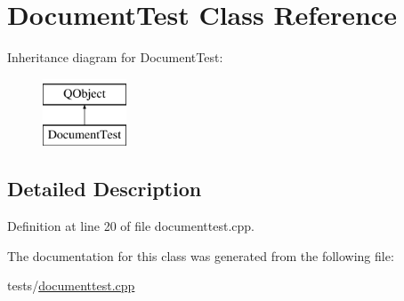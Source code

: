 \hypertarget{classDocumentTest}{\section{Document\+Test Class Reference}
\label{classDocumentTest}
}
Inheritance diagram for Document\+Test\+:\begin{figure}[H]
\begin{center}
\leavevmode
\includegraphics[height=2.000000cm]{classDocumentTest}
\end{center}
\end{figure}


\subsection{Detailed Description}


Definition at line 20 of file documenttest.\+cpp.



The documentation for this class was generated from the following file\+:\begin{DoxyCompactItemize}
\item 
tests/\hyperlink{documenttest_8cpp}{documenttest.\+cpp}\end{DoxyCompactItemize}
